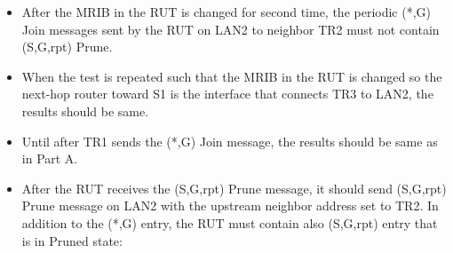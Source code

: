 \documentclass[11pt]{report}
\begin{document}
\begin{itemize}
  \item After the MRIB in the RUT is changed for second time, the periodic
  (*,G) Join messages sent by the RUT on LAN2 to neighbor TR2 must not contain
  (S,G,rpt) Prune.

  \item When the test is repeated such that the MRIB in the RUT is changed so
  the next-hop router toward S1 is the interface that connects TR3 to LAN2,
  the results should be same.

\end{itemize}


\begin{itemize}

  \item Until after TR1 sends the (*,G) Join message, the results should be
  same as in Part A.

  \item After the RUT receives the (S,G,rpt) Prune message, it should send
  (S,G,rpt) Prune message on LAN2 with the upstream neighbor address set to
  TR2. In addition to the (*,G) entry, the RUT must contain also
  (S,G,rpt) entry that is in Pruned state:


\end{itemize}
\end{document}

